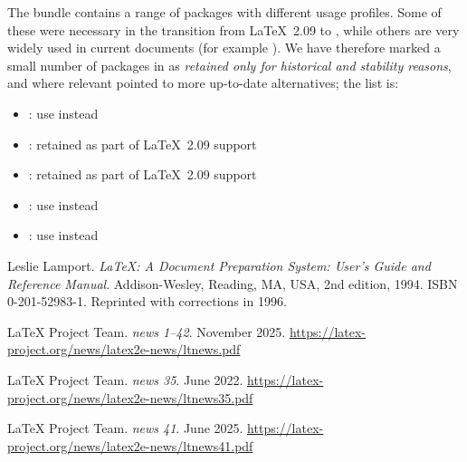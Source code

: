 \documentclass{ltnews}
\begin{document}
The  bundle contains a range of packages with different usage
profiles. Some of these were necessary in the transition from \LaTeX{}~2.09 to
\LaTeXe{}, while others are very widely used in current documents (for example
). We have therefore marked a small number of packages in
 as \emph{retained only for historical and stability reasons}, and
where relevant pointed to more up-to-date alternatives; the list is:
\begin{itemize}
  \item {}: use  instead
  \item {}: retained as part of \LaTeX{}~2.09 support
  \item {}: retained as part of \LaTeX{}~2.09 support
  \item {}: use  instead
  \item {}: use  instead
\end{itemize}


\begin{thebibliography}{9}\frenchspacing


Leslie Lamport.
\newblock \emph{{\LaTeX}: {A} Document Preparation System: User's Guide and Reference
  Manual}.
\newblock \mbox{Addison}-Wesley, Reading, MA, USA, 2nd edition, 1994.
\newblock ISBN 0-201-52983-1.
\newblock Reprinted with corrections in 1996.

 \LaTeX{} Project Team.
  \emph{\LaTeXe{} news 1--42}. November 2025.
  \url{https://latex-project.org/news/latex2e-news/ltnews.pdf}

 \LaTeX{} Project Team.
  \emph{\LaTeXe{} news 35}. June 2022.
  \url{https://latex-project.org/news/latex2e-news/ltnews35.pdf}

 \LaTeX{} Project Team.
  \emph{\LaTeXe{} news 41}. June 2025.
  \url{https://latex-project.org/news/latex2e-news/ltnews41.pdf}

\end{thebibliography}
\end{document}
